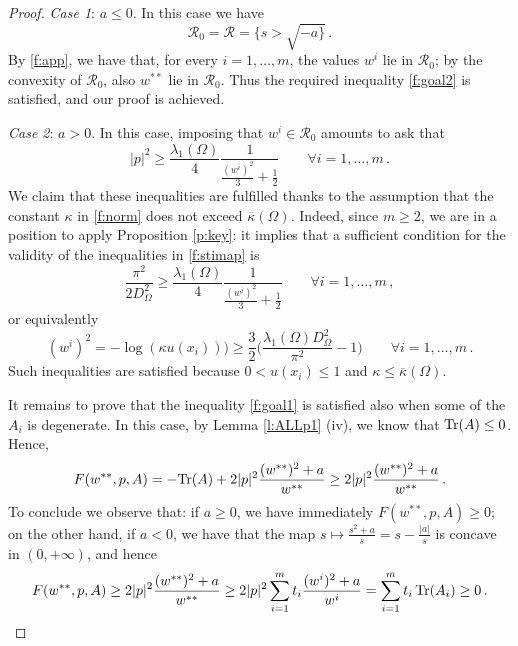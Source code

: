 \documentclass[11pt]{amsart}
\theoremstyle{definition}
\theoremstyle{remark}
\def\Om{\Omega}
\def\k{\kappa}
\DeclareMathOperator{\Tr}{Tr}
\begin{document}
\begin{proof}
 \smallskip
 {\it Case 1}:  $a \leq 0$. In this case we have 
 $${\mathcal R}_0=  \mathcal R = \{ s > \sqrt { - a \}}\,. $$ 
 By \eqref{f:app}, we have that, for every $i = 1, \dots, m$,  the values $w ^ i$ lie in $\mathcal R _0$; by the convexity of $\mathcal R _0$, also  $w ^{**}$ lie in $\mathcal R _0$. Thus
 the required inequality \eqref{f:goal2} is satisfied, and our proof is achieved.
 
 \smallskip 
  {\it Case 2}:  $a >0$. In this case,  imposing that $w ^ i \in \mathcal R _0$ amounts to ask that 
\begin{equation}\label{f:stimap}
|p| ^2\geq \frac{\lambda _ 1 (\Om) }{4} \frac{1}{\frac{ (w ^ i) ^ 2}{3} + \frac {1}{2}  } \qquad \forall i = 1, \dots, m \,.
\end{equation}
We claim that these inequalities are fulfilled thanks to the assumption that the constant $\kappa$ in \eqref{f:norm} does not exceed $\overline \kappa (\Om)$. 
Indeed, since $m \geq 2$, we are in a position to apply Proposition \ref{p:key}: it implies that
a sufficient condition for the validity of the inequalities in  \eqref{f:stimap} is 
 $$ \frac{\pi ^ 2}{2 D _\Om ^ 2} \geq   \frac{\lambda _ 1 (\Om) }{4} \frac{1}{\frac{ (w ^ i ) ^ 2}{3} + \frac {1}{2}  } \qquad \forall i = 1, \dots, m \,, $$ 
 or equivalently 
 $$( w^i ) ^ 2 =  - \log (\k u(x_i)) )   \geq  \frac 3 2 \Big ( \frac{ \lambda _ 1 (\Om) D _\Om^2  }{\pi ^ 2}  -1 \Big )  \qquad \forall i = 1, \dots, m   \,.$$ 
Such inequalities are satisfied  because  $0 < u (x_i) \leq 1$ and  $\kappa  \leq \overline \kappa (\Omega)$.  

 \smallskip
It remains to prove that  the inequality 
\eqref{f:goal1}  is satisfied also when some of the $A_i$ is degenerate. In this case, by  Lemma \ref{l:ALLp1} (iv), we know that ${\rm Tr} (A) \leq 0$. Hence,  
 $$
F (w^{**}, p, A ) 
 =  - {\rm Tr} ( A)  +  2|p|^ 2 \frac{( w^ {**} ) ^2 +a   }{w^{**}  }  \geq  2|p|^ 2 \frac{( w^ {**} ) ^2 +a   }{w^{**}  } \,.
$$
To conclude we observe that: if $a \geq 0$, we have immediately   $
 F (w^{**}, p, A ) \geq 0$; on the other hand, if $a <0$, we have that 
 the map $s \mapsto \frac{ s ^ 2 + a}{s} = s - \frac{|a|}{s}$ is concave in $(0, + \infty)$, and hence
 \[
 F (w^{**}, p, A )\geq  2|p|^ 2 \frac{( w^ {**} ) ^2 +a   }{w^{**}  }  \geq 2|p|^ 2  \sum _ {i= 1} ^m t_i \frac{ (w^ i )  ^ 2 + a}{w^ i}  =    \sum _ {i= 1} ^ m  t_i \Tr (A_i)  \geq 0 \,.
 \qedhere
\]
\end{proof}

\bigskip
\end{document}
